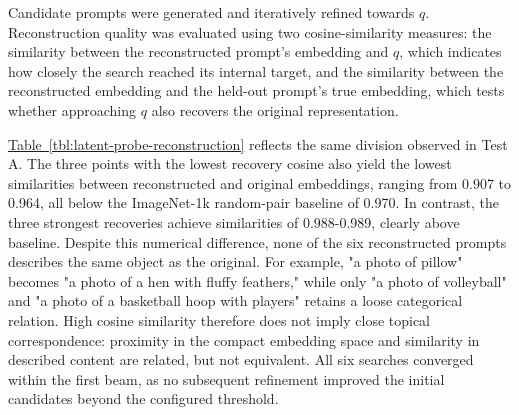 Candidate prompts were generated and iteratively refined towards $q$. Reconstruction quality was evaluated using two cosine-similarity measures: the similarity between the reconstructed prompt's embedding and $q$, which indicates how closely the search reached its internal target, and the similarity between the reconstructed embedding and the held-out prompt's true embedding, which tests whether approaching $q$ also recovers the original representation.

\begin{table}[htbp]
\centering
\caption{Test B reconstruction for six held-out points (three with the lowest, three with the highest Test A recovery cosine)}
\label{tbl:latent-probe-reconstruction}
\end{table}

\hyperref[tbl:latent-probe-reconstruction]{Table~\ref*{tbl:latent-probe-reconstruction}} reflects the same division observed in Test A. The three points with the lowest recovery cosine also yield the lowest similarities between reconstructed and original embeddings, ranging from 0.907 to 0.964, all below the ImageNet-1k random-pair baseline of 0.970. In contrast, the three strongest recoveries achieve similarities of 0.988-0.989, clearly above baseline. Despite this numerical difference, none of the six reconstructed prompts describes the same object as the original. For example, "a photo of pillow" becomes "a photo of a hen with fluffy feathers," while only "a photo of volleyball" and "a photo of a basketball hoop with players" retains a loose categorical relation. High cosine similarity therefore does not imply close topical correspondence: proximity in the compact embedding space and similarity in described content are related, but not equivalent. All six searches converged within the first beam, as no subsequent refinement improved the initial candidates beyond the configured threshold.

